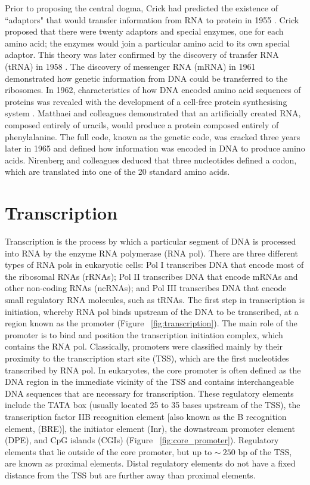 Prior to proposing the central dogma, Crick had predicted the existence of ``adaptors" that would transfer information from RNA to protein in 1955 \citep{cricktrna1955}. Crick proposed that there were twenty adaptors and special enzymes, one for each amino acid; the enzymes would join a particular amino acid to its own special adaptor. This theory was later confirmed by the discovery of transfer RNA (tRNA) in 1958 \citep{pmid13538965}. The discovery of messenger RNA (mRNA) in 1961 \citep{BRENNER1961} demonstrated how genetic information from DNA could be transferred to the ribosomes. In 1962, characteristics of how DNA encoded amino acid sequences of proteins was revealed with the development of a cell-free protein synthesising system \citep{pmid14471390}. Matthaei and colleagues demonstrated that an artificially created RNA, composed entirely of uracils, would produce a protein composed entirely of phenylalanine. The full code, known as the genetic code, was cracked three years later in 1965 \citep{pmid5330357} and defined how information was encoded in DNA to produce amino acids. Nirenberg and colleagues deduced that three nucleotides defined a codon, which are translated into one of the 20 standard amino acids.

\section{Transcription}

Transcription is the process by which a particular segment of DNA is processed into RNA by the enzyme RNA polymerase (RNA pol). There are three different types of RNA pols in eukaryotic cells: Pol I transcribes DNA that encode most of the ribosomal RNAs (rRNAs); Pol II transcribes DNA that encode mRNAs and other non-coding RNAs (ncRNAs); and Pol III transcribes DNA that encode small regulatory RNA molecules, such as tRNAs. The first step in transcription is initiation, whereby RNA pol binds upstream of the DNA to be transcribed, at a region known as the promoter (Figure ~\ref{fig:transcription}). The main role of the promoter is to bind and position the transcription initiation complex, which contains the RNA pol. Classically, promoters were classified mainly by their proximity to the transcription start site (TSS), which are the first nucleotides transcribed by RNA pol. In eukaryotes, the core promoter is often defined as the DNA region in the immediate vicinity of the TSS and contains interchangeable DNA sequences that are necessary for transcription. These regulatory elements include the TATA box (usually located 25 to 35 bases upstream of the TSS), the transcription factor IIB recognition element [also known as the B recognition element, (BRE)], the initiator element (Inr), the downstream promoter element (DPE), and CpG islands (CGIs) (Figure ~\ref{fig:core_promoter}). Regulatory elements that lie outside of the core promoter, but up to $\sim~250$ bp of the TSS, are known as proximal elements. Distal regulatory elements do not have a fixed distance from the TSS but are further away than proximal elements.

